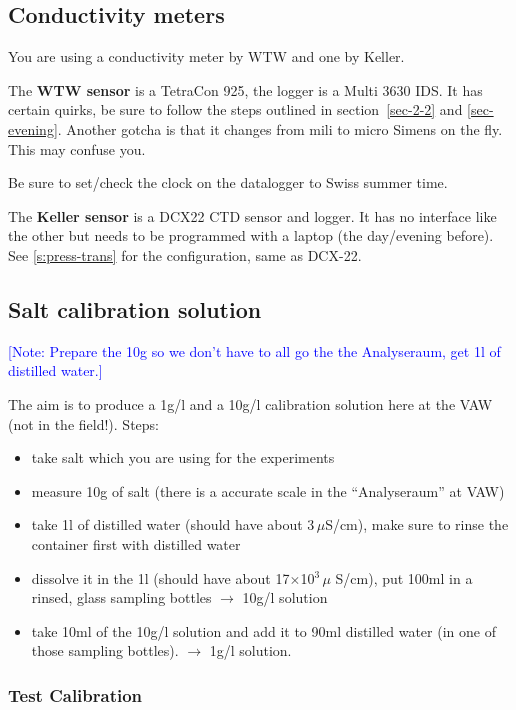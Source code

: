 \documentclass[DIV=15,halfparskip,11pt,headinclude]{scrartcl}
\newcommand{\note}[1]{\textcolor{blue}{[Note: #1]}}
\newcommand{\note}[1]{}
\begin{document}
\subsection{Conductivity meters}
\label{s:cond-meters}

You are using a conductivity meter by WTW and one by Keller.

The \textbf{WTW sensor} is a TetraCon 925, the logger is a Multi 3630 IDS.  It
has certain quirks, be sure to follow the steps outlined in
section~\ref{sec-2-2} and \ref{sec-evening}.  Another gotcha is that
it changes from mili to micro Simens on the fly.  This may confuse
you.

Be sure to set/check the clock on the datalogger to Swiss summer time.

The \textbf{Keller sensor} is a DCX22 CTD sensor and logger.  It has
no interface like the other but needs to be programmed with a laptop
(the day/evening before).  See \ref{s:press-trans} for the
configuration, same as DCX-22.

\subsection{Salt calibration solution}
\note{Prepare the 10g so we don't have to all go the the Analyseraum,
  get 1l of distilled water.}

The aim is to produce a 1g/l and a 10g/l calibration solution here at the VAW
(not in the field!).  Steps:
\begin{itemize}
\item take salt which you are using for the experiments
\item measure 10g of salt (there is a accurate scale in the
  ``Analyseraum'' at VAW)
\item take 1l of distilled water (should have about 3\,$\mu$S/cm),
  make sure to rinse the container first with distilled water
\item dissolve it in the 1l (should have about 17$\times$10$^3\,\mu$
  S/cm), put 100ml in a rinsed, glass sampling bottles $\rightarrow$
  10g/l solution
\item take 10ml of the 10g/l solution and add it to 90ml distilled
  water (in one of those sampling bottles).  $\rightarrow$ 1g/l
  solution.
\end{itemize}

\subsubsection{Test Calibration}
\end{document}
